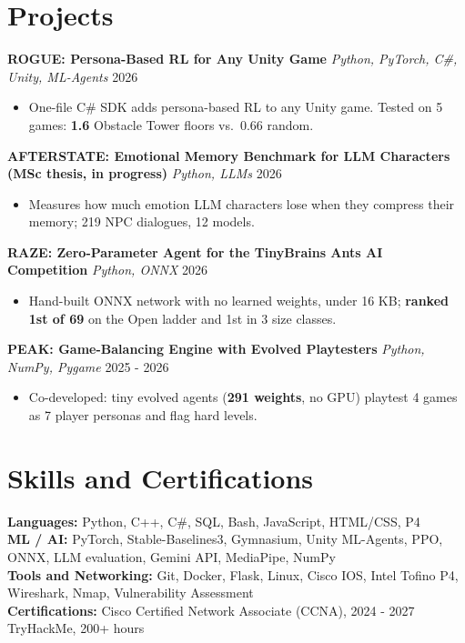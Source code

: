 \documentclass[letterpaper,10pt]{article}
\begin{document}
\section{Projects}
\textbf{ROGUE: Persona-Based RL for Any Unity Game} \textbar{} \textit{Python, PyTorch, C\#, Unity, ML-Agents} \hfill 2026
\begin{itemize}
  \item One-file C\# SDK adds persona-based RL to any Unity game. Tested on 5 games: \textbf{1.6} Obstacle Tower floors vs.\ 0.66 random.
\end{itemize}
\textbf{AFTERSTATE: Emotional Memory Benchmark for LLM Characters (MSc thesis, in progress)} \textbar{} \textit{Python, LLMs} \hfill 2026
\begin{itemize}
  \item Measures how much emotion LLM characters lose when they compress their memory; 219 NPC dialogues, 12 models.
\end{itemize}
\textbf{RAZE: Zero-Parameter Agent for the TinyBrains Ants AI Competition} \textbar{} \textit{Python, ONNX} \hfill 2026
\begin{itemize}
  \item Hand-built ONNX network with no learned weights, under 16 KB; \textbf{ranked 1st of 69} on the Open ladder and 1st in 3 size classes.
\end{itemize}
\textbf{PEAK: Game-Balancing Engine with Evolved Playtesters} \textbar{} \textit{Python, NumPy, Pygame} \hfill 2025 - 2026
\begin{itemize}
  \item Co-developed: tiny evolved agents (\textbf{291 weights}, no GPU) playtest 4 games as 7 player personas and flag hard levels.
\end{itemize}

\section{Skills and Certifications}
\textbf{Languages:} Python, C++, C\#, SQL, Bash, JavaScript, HTML/CSS, P4 \\
\textbf{ML / AI:} PyTorch, Stable-Baselines3, Gymnasium, Unity ML-Agents, PPO, ONNX, LLM evaluation, Gemini API, MediaPipe, NumPy \\
\textbf{Tools and Networking:} Git, Docker, Flask, Linux, Cisco IOS, Intel Tofino P4, Wireshark, Nmap, Vulnerability Assessment \\
\textbf{Certifications:} Cisco Certified Network Associate (CCNA), 2024 - 2027 \textbar{} TryHackMe, 200+ hours
\end{document}
